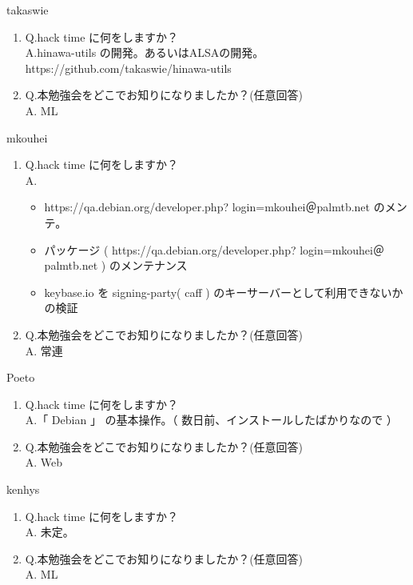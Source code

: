 \begin{prework}{ takaswie }
  \begin{enumerate}
  \item Q.hack time に何をしますか？\\
    A.hinawa-utils の開発。あるいはALSAの開発。\\
https://github.com/takaswie/hinawa-utils
  \item Q.本勉強会をどこでお知りになりましたか？(任意回答)\\
    A. ML
  \end{enumerate}
\end{prework}


\begin{prework}{ mkouhei }
  \begin{enumerate}
  \item Q.hack time に何をしますか？\\
    A.
    \begin{itemize}
    \item https://qa.debian.org/developer.php? login=mkouhei＠palmtb.net のメンテ。
    \item パッケージ ( https://qa.debian.org/developer.php? login=mkouhei＠palmtb.net ) のメンテナンス
    \item keybase.io を signing-party( caff ) のキーサーバーとして利用できないかの検証

   \end{itemize}
    \item Q.本勉強会をどこでお知りになりましたか？(任意回答)\\
    A. 常連
   \end{enumerate}
\end{prework}

\begin{prework}{ Poeto }
  \begin{enumerate}
  \item Q.hack time に何をしますか？\\
    A.「 Debian 」 の基本操作。（ 数日前、インストールしたばかりなので ）
  \item Q.本勉強会をどこでお知りになりましたか？(任意回答)\\
    A. Web
  \end{enumerate}
\end{prework}

\begin{prework}{ kenhys }
  \begin{enumerate}
  \item Q.hack time に何をしますか？\\
    A. 未定。
  \item Q.本勉強会をどこでお知りになりましたか？(任意回答)\\
    A. ML
  \end{enumerate}
\end{prework}

